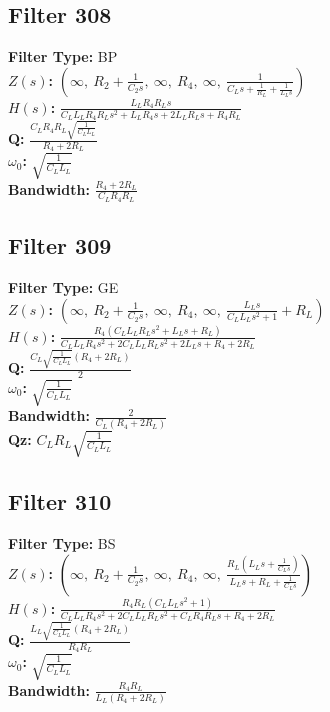 \documentclass{article}
\begin{document}
\subsection*{Filter 308}
\textbf{Filter Type:} BP \\ 
\textbf{$Z(s)$:} $\left( \infty, \  R_{2} + \frac{1}{C_{2} s}, \  \infty, \  R_{4}, \  \infty, \  \frac{1}{C_{L} s + \frac{1}{R_{L}} + \frac{1}{L_{L} s}}\right)$ \\ 
\textbf{$H(s)$:} $\frac{L_{L} R_{4} R_{L} s}{C_{L} L_{L} R_{4} R_{L} s^{2} + L_{L} R_{4} s + 2 L_{L} R_{L} s + R_{4} R_{L}}$ \\ 
\textbf{Q:} $\frac{C_{L} R_{4} R_{L} \sqrt{\frac{1}{C_{L} L_{L}}}}{R_{4} + 2 R_{L}}$ \\ 
\textbf{$\omega_0$:} $\sqrt{\frac{1}{C_{L} L_{L}}}$ \\ 
\textbf{Bandwidth:} $\frac{R_{4} + 2 R_{L}}{C_{L} R_{4} R_{L}}$ \\ 
\subsection*{Filter 309}
\textbf{Filter Type:} GE \\ 
\textbf{$Z(s)$:} $\left( \infty, \  R_{2} + \frac{1}{C_{2} s}, \  \infty, \  R_{4}, \  \infty, \  \frac{L_{L} s}{C_{L} L_{L} s^{2} + 1} + R_{L}\right)$ \\ 
\textbf{$H(s)$:} $\frac{R_{4} \left(C_{L} L_{L} R_{L} s^{2} + L_{L} s + R_{L}\right)}{C_{L} L_{L} R_{4} s^{2} + 2 C_{L} L_{L} R_{L} s^{2} + 2 L_{L} s + R_{4} + 2 R_{L}}$ \\ 
\textbf{Q:} $\frac{C_{L} \sqrt{\frac{1}{C_{L} L_{L}}} \left(R_{4} + 2 R_{L}\right)}{2}$ \\ 
\textbf{$\omega_0$:} $\sqrt{\frac{1}{C_{L} L_{L}}}$ \\ 
\textbf{Bandwidth:} $\frac{2}{C_{L} \left(R_{4} + 2 R_{L}\right)}$ \\ 
\textbf{Qz:} $C_{L} R_{L} \sqrt{\frac{1}{C_{L} L_{L}}}$ \\ 
\subsection*{Filter 310}
\textbf{Filter Type:} BS \\ 
\textbf{$Z(s)$:} $\left( \infty, \  R_{2} + \frac{1}{C_{2} s}, \  \infty, \  R_{4}, \  \infty, \  \frac{R_{L} \left(L_{L} s + \frac{1}{C_{L} s}\right)}{L_{L} s + R_{L} + \frac{1}{C_{L} s}}\right)$ \\ 
\textbf{$H(s)$:} $\frac{R_{4} R_{L} \left(C_{L} L_{L} s^{2} + 1\right)}{C_{L} L_{L} R_{4} s^{2} + 2 C_{L} L_{L} R_{L} s^{2} + C_{L} R_{4} R_{L} s + R_{4} + 2 R_{L}}$ \\ 
\textbf{Q:} $\frac{L_{L} \sqrt{\frac{1}{C_{L} L_{L}}} \left(R_{4} + 2 R_{L}\right)}{R_{4} R_{L}}$ \\ 
\textbf{$\omega_0$:} $\sqrt{\frac{1}{C_{L} L_{L}}}$ \\ 
\textbf{Bandwidth:} $\frac{R_{4} R_{L}}{L_{L} \left(R_{4} + 2 R_{L}\right)}$ \\ 
\end{document}
